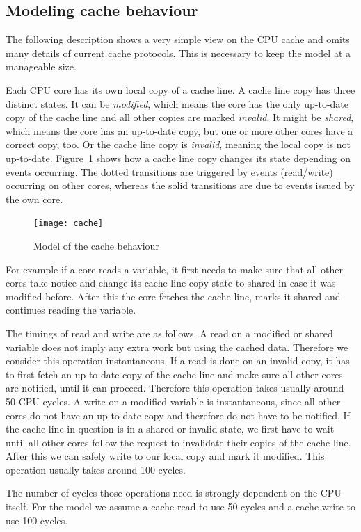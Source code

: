 \documentclass[a4paper, 10pt]{article}
\begin{document}
\subsection{Modeling cache behaviour}
The following description shows a very simple view on the CPU cache and omits many details of current cache protocols. This is necessary to keep the model at a manageable size.

Each CPU core has its own local copy of a cache line. A cache line copy has three distinct states. It can be \emph{modified}, which means the core has the only up-to-date copy of the cache line and all other copies are marked \emph{invalid}. It might be \emph{shared}, which means the core has an up-to-date copy, but one or more other cores have a correct copy, too. Or the cache line copy is \emph{invalid}, meaning the local copy is not up-to-date. Figure~\ref{fig:cache} shows how a cache line copy changes its state depending on events occurring. The dotted transitions are triggered by events (read/write) occurring on other cores, whereas the solid transitions are due to events issued by the own core.
\begin{figure}[htbp]
	\centering
	\texttt{[image: cache]}
	\caption{Model of the cache behaviour}
	\label{fig:cache}
\end{figure}

For example if a core reads a variable, it first needs to make sure that all other cores take notice and change its cache line copy state to shared in case it was modified before. After this the core fetches the cache line, marks it shared and continues reading the variable.

The timings of read and write are as follows. A read on a modified or shared variable does not imply any extra work but using the cached data. Therefore we consider this operation instantaneous. If a read is done on an invalid copy, it has to first fetch an up-to-date copy of the cache line and make sure all other cores are notified, until it can proceed. Therefore this operation takes usually around 50 CPU cycles. A write on a modified variable is instantaneous, since all other cores do not have an up-to-date copy and therefore do not have to be notified. If the cache line in question is in a shared or invalid state, we first have to wait until all other cores follow the request to invalidate their copies of the  cache line. After this we can safely write to our local copy and mark it modified. This operation usually takes around 100 cycles.

The number of cycles those operations need is strongly dependent on the CPU itself. For the model we assume a cache read to use 50 cycles and a cache write to use 100 cycles.
\end{document}
